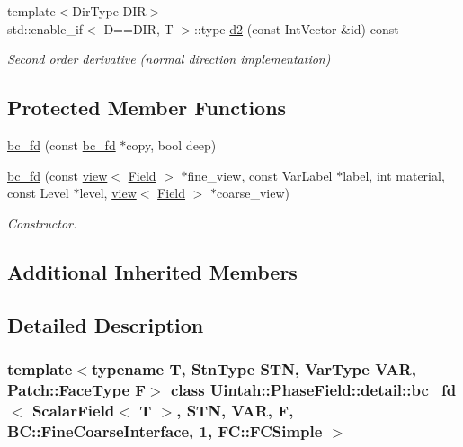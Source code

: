 \begin{DoxyCompactItemize}
{\footnotesize template$<$Dir\+Type D\+IR$>$ }\\std\+::enable\+\_\+if$<$ D==D\+IR, T $>$\+::type \hyperlink{classUintah_1_1PhaseField_1_1detail_1_1bc__fd_3_01ScalarField_3_01T_01_4_00_01STN_00_01VAR_00_01ce55d0bf8381798bc129da931b626e80_a884390e9ecd0c377a1074e8b48507f72}{d2} (const Int\+Vector \&id) const
\begin{DoxyCompactList}\small\item\em Second order derivative (normal direction implementation) \end{DoxyCompactList}\end{DoxyCompactItemize}
\subsection*{Protected Member Functions}
\begin{DoxyCompactItemize}
\item 
\hyperlink{classUintah_1_1PhaseField_1_1detail_1_1bc__fd_3_01ScalarField_3_01T_01_4_00_01STN_00_01VAR_00_01ce55d0bf8381798bc129da931b626e80_a4ff2e7573d5e22d6e6d044016f22937e}{bc\+\_\+fd} (const \hyperlink{classUintah_1_1PhaseField_1_1detail_1_1bc__fd}{bc\+\_\+fd} $\ast$copy, bool deep)
\item 
\hyperlink{classUintah_1_1PhaseField_1_1detail_1_1bc__fd_3_01ScalarField_3_01T_01_4_00_01STN_00_01VAR_00_01ce55d0bf8381798bc129da931b626e80_ad85c6eec21f8abe2b7d97cc5eab97cb3}{bc\+\_\+fd} (const \hyperlink{classUintah_1_1PhaseField_1_1detail_1_1view}{view}$<$ \hyperlink{structUintah_1_1PhaseField_1_1ScalarField}{Field} $>$ $\ast$fine\+\_\+view, const Var\+Label $\ast$label, int material, const Level $\ast$level, \hyperlink{classUintah_1_1PhaseField_1_1detail_1_1view}{view}$<$ \hyperlink{structUintah_1_1PhaseField_1_1ScalarField}{Field} $>$ $\ast$coarse\+\_\+view)
\begin{DoxyCompactList}\small\item\em Constructor. \end{DoxyCompactList}\end{DoxyCompactItemize}
\subsection*{Additional Inherited Members}


\subsection{Detailed Description}
\subsubsection*{template$<$typename T, Stn\+Type S\+TN, Var\+Type V\+AR, Patch\+::\+Face\+Type F$>$\newline
class Uintah\+::\+Phase\+Field\+::detail\+::bc\+\_\+fd$<$ Scalar\+Field$<$ T $>$, S\+T\+N, V\+A\+R, F, B\+C\+::\+Fine\+Coarse\+Interface, 1, F\+C\+::\+F\+C\+Simple $>$}

